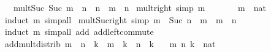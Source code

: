 \begin{isabellebody}
\ \ {\isacharbar}{\kern0pt}\ mult{\isacharunderscore}{\kern0pt}Suc{\isacharcolon}{\kern0pt}\ {\isachardoublequoteopen}Suc\ m\ {\isacharasterisk}{\kern0pt}\ n\ {\isacharequal}{\kern0pt}\ n\ {\isacharplus}{\kern0pt}\ {\isacharparenleft}{\kern0pt}m\ {\isacharasterisk}{\kern0pt}\ n{\isacharparenright}{\kern0pt}{\isachardoublequoteclose}\isanewline
\isanewline
{}\isamarkupfalse%
\ mult{\isacharunderscore}{\kern0pt}{}{\isacharunderscore}{\kern0pt}right\ {\isacharbrackleft}{\kern0pt}simp{\isacharbrackright}{\kern0pt}{\isacharcolon}{\kern0pt}\ {\isachardoublequoteopen}m\ {\isacharasterisk}{\kern0pt}\ {}\ {\isacharequal}{\kern0pt}\ {}{\isachardoublequoteclose}\isanewline
\ \ \ m\ {\isacharcolon}{\kern0pt}{\isacharcolon}{\kern0pt}\ nat\isanewline
%
\isadelimproof
\ \ %
\endisadelimproof
%
\isatagproof
{}\isamarkupfalse%
\ {\isacharparenleft}{\kern0pt}induct\ m{\isacharparenright}{\kern0pt}\ simp{\isacharunderscore}{\kern0pt}all%
\endisatagproof
{\isafoldproof}%
%
\isadelimproof
\isanewline
%
\endisadelimproof
\isanewline
{}\isamarkupfalse%
\ mult{\isacharunderscore}{\kern0pt}Suc{\isacharunderscore}{\kern0pt}right\ {\isacharbrackleft}{\kern0pt}simp{\isacharbrackright}{\kern0pt}{\isacharcolon}{\kern0pt}\ {\isachardoublequoteopen}m\ {\isacharasterisk}{\kern0pt}\ Suc\ n\ {\isacharequal}{\kern0pt}\ m\ {\isacharplus}{\kern0pt}\ {\isacharparenleft}{\kern0pt}m\ {\isacharasterisk}{\kern0pt}\ n{\isacharparenright}{\kern0pt}{\isachardoublequoteclose}\isanewline
%
\isadelimproof
\ \ %
\endisadelimproof
%
\isatagproof
{}\isamarkupfalse%
\ {\isacharparenleft}{\kern0pt}induct\ m{\isacharparenright}{\kern0pt}\ {\isacharparenleft}{\kern0pt}simp{\isacharunderscore}{\kern0pt}all\ add{\isacharcolon}{\kern0pt}\ add{\isachardot}{\kern0pt}left{\isacharunderscore}{\kern0pt}commute{\isacharparenright}{\kern0pt}%
\endisatagproof
{\isafoldproof}%
%
\isadelimproof
\isanewline
%
\endisadelimproof
\isanewline
{}\isamarkupfalse%
\ add{\isacharunderscore}{\kern0pt}mult{\isacharunderscore}{\kern0pt}distrib{\isacharcolon}{\kern0pt}\ {\isachardoublequoteopen}{\isacharparenleft}{\kern0pt}m\ {\isacharplus}{\kern0pt}\ n{\isacharparenright}{\kern0pt}\ {\isacharasterisk}{\kern0pt}\ k\ {\isacharequal}{\kern0pt}\ {\isacharparenleft}{\kern0pt}m\ {\isacharasterisk}{\kern0pt}\ k{\isacharparenright}{\kern0pt}\ {\isacharplus}{\kern0pt}\ {\isacharparenleft}{\kern0pt}n\ {\isacharasterisk}{\kern0pt}\ k{\isacharparenright}{\kern0pt}{\isachardoublequoteclose}\isanewline
\ \ \ m\ n\ k\ {\isacharcolon}{\kern0pt}{\isacharcolon}{\kern0pt}\ nat\isanewline

\end{isabellebody}
